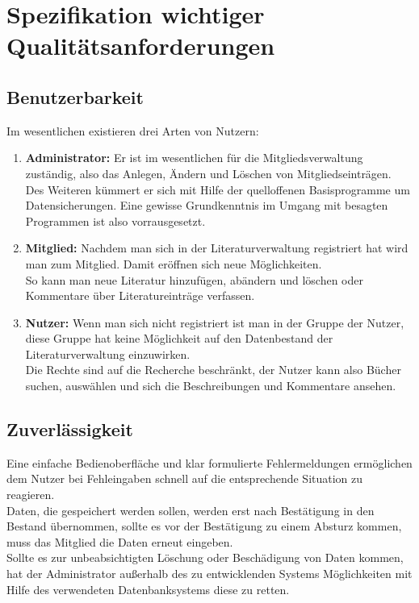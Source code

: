 \chapter{Spezifikation wichtiger Qualitätsanforderungen}
\section{Benutzerbarkeit}
Im wesentlichen existieren drei Arten von Nutzern:

\begin{enumerate}
 \item \textbf{Administrator:}
Er ist im wesentlichen f\"ur die Mitgliedsverwaltung zust\"andig, also das Anlegen, \"Andern und L\"oschen von Mitgliedseintr\"agen. \\
Des Weiteren k\"ummert er sich mit Hilfe der quelloffenen Basisprogramme um Datensicherungen. Eine gewisse Grundkenntnis im Umgang mit
besagten Programmen ist also vorrausgesetzt.

 \item \textbf{Mitglied:}
Nachdem man sich in der Literaturverwaltung registriert hat wird man zum Mitglied. Damit er\"offnen sich neue M\"oglichkeiten. \\
So kann man neue Literatur hinzuf\"ugen, ab\"andern und l\"oschen oder Kommentare \"uber Literatureintr\"age verfassen.

 \item \textbf{Nutzer:}
Wenn man sich nicht registriert ist man in der Gruppe der Nutzer, diese Gruppe hat keine M\"oglichkeit auf den Datenbestand der Literaturverwaltung einzuwirken.\\
Die Rechte sind auf die Recherche beschr\"ankt, der Nutzer kann also B\"ucher suchen, ausw\"ahlen und sich die Beschreibungen und Kommentare ansehen.
\end{enumerate}

\section{Zuverlässigkeit}
Eine einfache Bedienoberfl\"ache und klar formulierte Fehlermeldungen erm\"oglichen dem Nutzer bei Fehleingaben schnell auf die entsprechende Situation zu reagieren.\\
Daten, die gespeichert werden sollen, werden erst nach Best\"atigung in den Bestand \"ubernommen, sollte es vor der Best\"atigung zu einem Absturz kommen, muss das Mitglied die Daten erneut eingeben. \\
Sollte es zur unbeabsichtigten L\"oschung oder Besch\"adigung von Daten kommen, hat der Administrator au\ss erhalb des zu entwicklenden Systems M\"oglichkeiten mit Hilfe des verwendeten Datenbanksystems diese zu retten.

